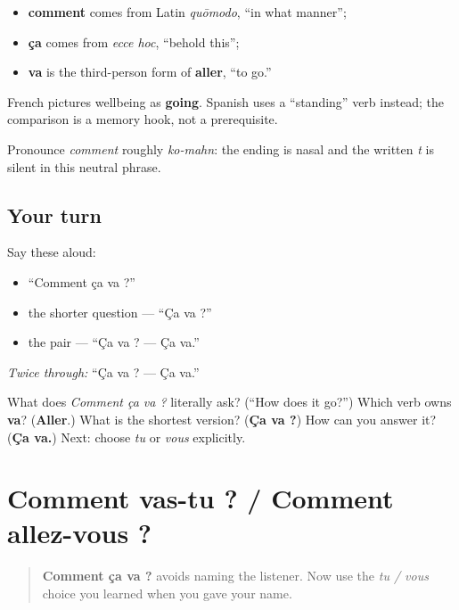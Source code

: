\begin{cousinweb}
\begin{itemize}
\raggedright
  \item \textbf{comment} comes from Latin \emph{quōmodo}, “in what manner”;
  \item \textbf{ça} comes from \emph{ecce hoc}, “behold this”;
  \item \textbf{va} is the third-person form of \textbf{aller}, “to go.”
\end{itemize}

French pictures wellbeing as \textbf{going}. Spanish uses a “standing” verb instead; the comparison is a memory hook, not a prerequisite.

Pronounce \emph{comment} roughly \emph{ko-mahn}: the ending is nasal and the written \emph{t} is silent in this neutral phrase.
\end{cousinweb}

\subsection*{Your turn}
Say these aloud:

\begin{itemize}
\raggedright
  \item “Comment ça va ?”
  \item the shorter question — “Ça va ?”
  \item the pair — “Ça va ? — Ça va.”
\end{itemize}

\emph{Twice through:} “Ça va ? — Ça va.”

\begin{tcolorbox}[breakable,colback=teal!4,colframe=teal!35!black,title={Before you move on}]
What does \emph{Comment ça va ?} literally ask? (“How does it go?”) Which verb owns \textbf{va}? (\textbf{Aller}.) What is the shortest version? (\textbf{Ça va ?}) How can you answer it? (\textbf{Ça va.}) Next: choose \emph{tu} or \emph{vous} explicitly.
\end{tcolorbox}
\section[Comment vas-tu ? / Comment allez-vous ?]{Comment vas-tu ? / Comment allez-vous ?}

\label{lesson:FR-C03-comment-registers}



\begin{quote}
\textbf{Comment ça va ?} avoids naming the listener. Now use the \emph{tu / vous} choice you learned when you gave your name.
\end{quote}

